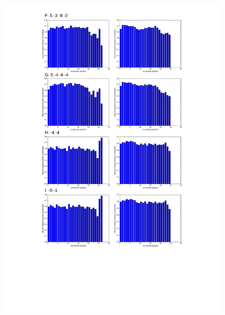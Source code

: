 \documentclass[12pt]{article}
\begin{document}
\begin{figure}
\includegraphics[scale=0.65]{results/combined_results2.pdf}
\end{figure}
\end{document}

